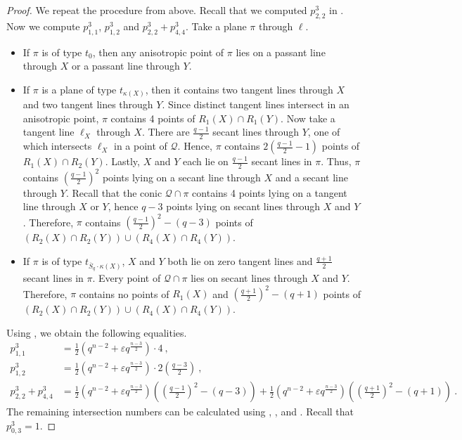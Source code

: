 \documentclass[a4paper]{article}
\theoremstyle{definition}
\newcommand{\eps}{\varepsilon}
\newcommand{\mq}{\mathcal Q}
\newcommand{\ns}{\overline S}
\begin{document}
\begin{proof}
 We repeat the procedure from above.
 Recall that we computed $p^3_{2,2}$ in .
 Now we compute $p^3_{1,1}$, $p^3_{1,2}$ and $p^3_{2,2} + p^3_{4,4}$.
 Take a plane $\pi$ through $\ell$.
 \begin{itemize}
  \item If $\pi$ is of type $t_0$, then any anisotropic point of $\pi$ lies on a passant line through $X$ or a passant line through $Y$.
  \item If $\pi$ is a plane of type $t_{\kappa(X)}$, then it contains two tangent lines through $X$ and two tangent lines through $Y$.
  Since distinct tangent lines intersect in an anisotropic point, $\pi$ contains 4 points of $R_1(X) \cap R_1(Y)$.
  Now take a tangent line $\ell_X$ through $X$.
  There are $\frac{q-1}2$ secant lines through $Y$, one of which intersects $\ell_X$ in a point of $\mq$.
  Hence, $\pi$ contains $2\left( \frac{q-1}2 - 1 \right)$ points of $R_1(X) \cap R_2(Y)$.
  Lastly, $X$ and $Y$ each lie on $\frac{q-1}2$ secant lines in $\pi$.
  Thus, $\pi$ contains $\left( \frac{q-1}2 \right)^2$ points lying on a secant line through $X$ and a secant line through $Y$.
  Recall that the conic $\mq \cap \pi$ contains 4 points lying on a tangent line through $X$ or $Y$, hence $q-3$ points lying on secant lines through $X$ and $Y$.
  Therefore, $\pi$ contains $\left( \frac{q-1}2 \right)^2 - (q-3)$ points of $(R_2(X) \cap R_2(Y)) \cup (R_4(X) \cap R_4(Y))$.
  \item If $\pi$ is of type $t_{\ns_q \cdot \kappa(X)}$, $X$ and $Y$ both lie on zero tangent lines and $\frac{q+1}2$ secant lines in $\pi$.
  Every point of $\mq \cap \pi$ lies on secant lines through $X$ and $Y$.
  Therefore, $\pi$ contains no points of $R_1(X)$ and $\left( \frac{q+1}2 \right )^2 - (q+1)$ points of $(R_2(X) \cap R_2(Y)) \cup (R_4(X) \cap R_4(Y))$.
 \end{itemize}
 Using , we obtain the following equalities.
 \begin{align*}
  p^{3}_{1,1}&=\frac{1}{2}\left(q^{n-2}+\eps q^{\frac{n-3}{2}}\right)\cdot 4\:,\\
  p^{3}_{1,2}&=\frac{1}{2}\left(q^{n-2}+\eps q^{\frac{n-3}{2}}\right)\cdot 2\left(\frac{q-3}{2}\right)\:,\\
  p^{3}_{2,2}+p^{3}_{4,4}&=\frac{1}{2}\left(q^{n-2}+\eps q^{\frac{n-3}{2}}\right)\left(\left(\frac{q-1}{2}\right)^{2}-(q-3)\right)+\frac{1}{2}\left(q^{n-2}+\eps q^{\frac{n-3}{2}}\right)\left(\left(\frac{q+1}{2}\right)^{2}-(q+1)\right)\:.
 \end{align*}
 The remaining intersection numbers can be calculated using , , and . Recall that $p^{3}_{0,3}=1$.
\end{proof}
\end{document}
